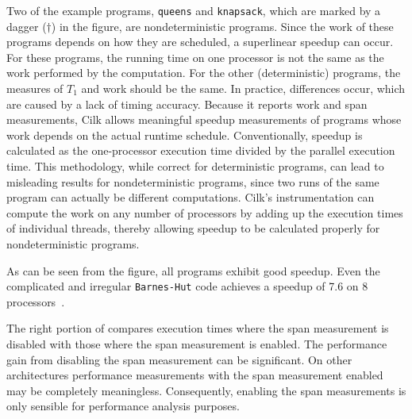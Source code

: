 Two of the example programs, \texttt{queens} and \texttt{knapsack},
which are marked by a dagger ($\dagger$) in the figure, are
nondeterministic programs.  Since the work of these programs depends
on how they are scheduled, a superlinear speedup can occur.
For these programs, the running time on one processor is not the same
as the work performed by the computation. For the other
(deterministic) programs, the measures of $T_1$ and work should be the
same.  In practice, differences occur, which are caused by a lack of
timing accuracy.  Because it reports work and span measurements, Cilk
allows meaningful speedup measurements of programs whose work depends
on the actual runtime schedule. Conventionally, speedup is calculated
as the one-processor execution time divided by the parallel execution
time.  This methodology, while correct for deterministic programs, can
lead to misleading results for nondeterministic programs, since two
runs of the same program can actually be different computations.
Cilk's instrumentation can compute the work on any number of
processors by adding up the execution times of individual threads,
thereby allowing speedup to be calculated properly for
nondeterministic programs.

As can be seen from the figure, all programs exhibit good speedup.
Even the complicated and irregular \texttt{Barnes-Hut} code achieves a
speedup of 7.6 on 8 processors~\cite{Randall98}.

The right portion of  compares execution times where
the span measurement is disabled with those where the span measurement
is enabled. The performance gain from disabling the span measurement
can be significant. On other architectures performance measurements
with the span measurement enabled may be completely meaningless.
Consequently, enabling the span measurements is only sensible for
performance analysis purposes.


